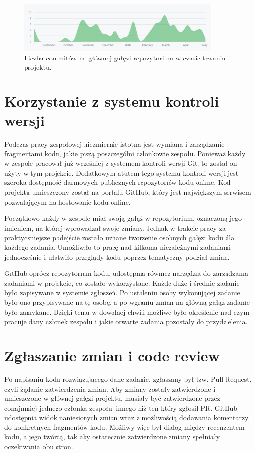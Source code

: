 \documentclass[licencjacka]{pracamgr}
\begin{document}
\begin{figure}[h]
  \centering
  \includegraphics[width=0.9\textwidth]{commits_over_time}
  \caption{Liczba commitów na głównej gałęzi repozytorium w czasie trwania projektu.}
  \label{img:commits_over_time}
\end{figure}

\section{Korzystanie z systemu kontroli wersji}
Podczas pracy zespołowej niezmiernie istotna jest wymiana i zarządzanie fragmentami kodu,
jakie piszą poszczególni członkowie zespołu. Ponieważ każdy w zespole pracował już
wcześniej z systemem kontroli wersji Git, to został on użyty w tym projekcie.
Dodatkowym atutem tego systemu kontroli wersji jest szeroka dostępność darmowych
publicznych repozytoriów kodu online. Kod projektu umieszczony został na portalu
GitHub, który jest największym serwisem pozwalającym na hostowanie kodu online.

Początkowo każdy w zespole miał swoją gałąź w repozytorium, oznaczoną jego imieniem,
na której wprowadzał swoje zmiany. Jednak w trakcie pracy za praktyczniejsze podejście
zostało uznane tworzenie osobnych gałęzi kodu dla każdego zadania.
Umożliwiło to pracę nad kilkoma niezależnymi zadaniami jednocześnie i ułatwiło
przeglądy kodu poprzez tematyczny podział zmian.

GitHub oprócz repozytorium kodu, udostępnia również narzędzia do zarządzania zadaniami
w projekcie, co zostało wykorzystane. Każde duże i średnie zadanie było zapisywane
w systemie zgłoszeń. Po ustaleniu osoby wykonującej zadanie było ono przypisywane
na tę osobę, a po wgraniu zmian na główną gałąz zadanie było zamykane.
Dzięki temu w dowolnej chwili możliwe było określenie nad czym pracuje dany członek
zespołu i jakie otwarte zadania pozostały do przydzielenia.

\section{Zgłaszanie zmian i code review}
Po napisaniu kodu rozwiązującego dane zadanie, zgłaszany był tzw. Pull Request,
czyli żądanie zatwierdzenia zmian. Aby zmiany zostały zatwierdzone i umieszczone
w głównej gałęzi projektu, musiały być zatwierdzone przez conajmniej jednego członka
zespołu, innego niż ten który zgłosił PR. GitHub udostępnia widok naniesionych zmian
wraz z możliwością dodawania komentarzy do konkretnych fragmentów kodu. Możliwy więc
był dialog między recenzentem kodu, a jego twórcą, tak aby ostatecznie zatwierdzone
zmiany spełniały oczekiwania obu stron.
\end{document}
